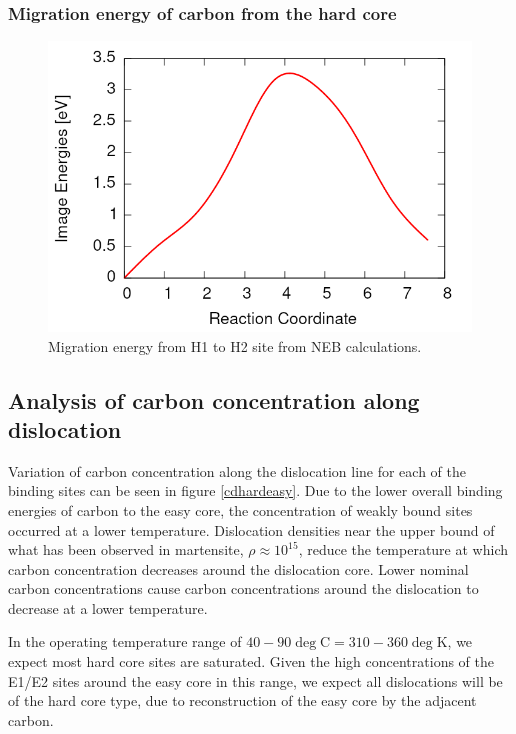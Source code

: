 \documentclass[a4paper,11pt]{article}
\begin{document}
\subsubsection{Migration energy of carbon from the hard core}
\label{sec:org005bab1}

\begin{figure}[htbp]
\centering
\includegraphics[width=.9\linewidth]{Images/H1-H1_migration_energy_barrier.png}
\caption{Migration energy from H1 to H2 site from NEB calculations.}
\end{figure}



\subsection{Analysis of carbon concentration along dislocation}
\label{sec:orgacdb929}

Variation of carbon concentration along the dislocation line for each of the binding sites can be
seen in figure \ref{cdhardeasy}. Due to the lower overall binding energies of carbon to the easy
core, the concentration of weakly bound sites occurred at a lower temperature. Dislocation
densities near the upper bound of what has been observed in martensite, \(\rho \approx10^{15}\), reduce
the temperature at which carbon concentration decreases around the dislocation core. Lower
nominal carbon concentrations cause carbon concentrations around the dislocation to decrease at a
lower temperature.

In the operating temperature range of \(40-90\deg\text{C} = 310-360\deg\text{K}\), we expect most hard
core sites are saturated. Given the high concentrations of the E1/E2 sites around the easy core
in this range, we expect all dislocations will be of the hard core type, due to reconstruction of
the easy core by the adjacent carbon.
\end{document}
